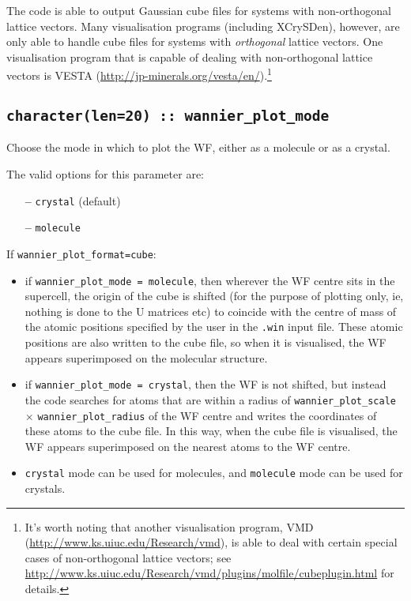 The code is able to output Gaussian cube files for systems with non-orthogonal lattice vectors.
Many visualisation programs (including XCrySDen), however, are only able to handle cube files for systems
with \emph{orthogonal} lattice vectors. One visualisation program that is capable of dealing with non-orthogonal lattice vectors is
VESTA (\url{http://jp-minerals.org/vesta/en/}).\footnote{It's worth noting that another
  visualisation program, VMD (\url{http://www.ks.uiuc.edu/Research/vmd}), is able to
  deal with certain special cases of non-orthogonal lattice
  vectors; see \url{http://www.ks.uiuc.edu/Research/vmd/plugins/molfile/cubeplugin.html} for details.}

\subsection[wannier\_plot\_mode]{\tt character(len=20) :: wannier\_plot\_mode}

Choose the mode in which to plot the WF, either as a molecule
or as a crystal.

The valid options for this parameter are:
\begin{itemize}
\item[{\bf --}] \verb#crystal# (default)
\item[{\bf --}] \verb#molecule#
\end{itemize}

If {\tt wannier\_plot\_format=cube}:
\begin{itemize}
\item if {\tt wannier\_plot\_mode = molecule}, then wherever the WF centre sits in the supercell, the origin of the cube is shifted (for the purpose of plotting only, ie, nothing is done to the U matrices etc) to coincide with the centre of mass of the atomic positions specified by the user in the {\tt *.win} input file. These atomic positions are also written to the cube file, so when it is visualised, the WF appears superimposed on the molecular structure.
\item if {\tt wannier\_plot\_mode = crystal}, then the WF is not shifted, but instead the code searches for atoms that are within a radius of {\tt wannier\_plot\_scale} $\times$ {\tt wannier\_plot\_radius} of the WF centre and writes the coordinates of these atoms to the cube file. In this way, when the cube file is visualised, the WF appears superimposed on the nearest atoms to the WF centre.
\item {\tt crystal} mode can be used for molecules, and {\tt molecule} mode can be used for crystals.
\end{itemize}

